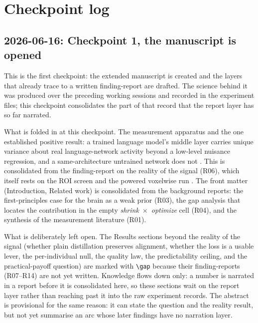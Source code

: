 %

\section*{Checkpoint log}

\subsection*{2026-06-16: Checkpoint 1, the manuscript is opened}

This is the first checkpoint: the extended manuscript is created and the layers that already trace to a written finding-report are drafted.
The science behind it was produced over the preceding working sessions and recorded in the experiment files; this checkpoint consolidates the part of that record that the report layer has so far narrated.

What is folded in at this checkpoint.
The measurement apparatus and the one established positive result: a trained language model's middle layer carries unique variance about real language-network activity beyond a low-level nuisance regression, and a same-architecture untrained network does not .
This is consolidated from the finding-report on the reality of the signal (R06), which itself rests on the ROI screen  and the powered voxelwise run .
The front matter (Introduction, Related work) is consolidated from the background reports: the first-principles case for the brain as a weak prior (R03), the gap analysis that locates the contribution in the empty \emph{shrink}~$\times$~\emph{optimize} cell (R04), and the synthesis of the measurement literature (R01).

What is deliberately left open.
The Results sections beyond the reality of the signal (whether plain distillation preserves alignment, whether the loss is a usable lever, the per-individual null, the quality law, the predictability ceiling, and the practical-payoff question) are marked with \verb|\gap| because their finding-reports (R07--R14) are not yet written.
Knowledge flows down only: a number is narrated in a report before it is consolidated here, so these sections wait on the report layer rather than reaching past it into the raw experiment records.
The abstract is provisional for the same reason: it can state the question and the reality result, but not yet summarise an arc whose later findings have no narration layer.

